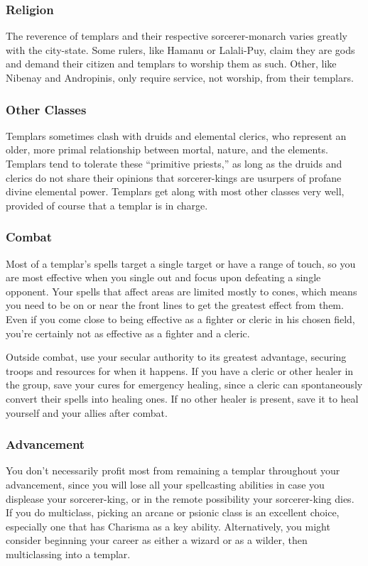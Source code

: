\subsubsection{Religion}
The reverence of templars and their respective sorcerer-monarch varies greatly with the city-state. Some rulers, like Hamanu or Lalali-Puy, claim they are gods and demand their citizen and templars to worship them as such. Other, like Nibenay and Andropinis, only require service, not worship, from their templars.

\subsubsection{Other Classes}
Templars sometimes clash with druids and elemental clerics, who represent an older, more primal relationship between mortal, nature, and the elements. Templars tend to tolerate these ``primitive priests,'' as long as the druids and clerics do not share their opinions that sorcerer-kings are usurpers of profane divine elemental power. Templars get along with most other classes very well, provided of course that a templar is in charge.

\subsubsection{Combat}
Most of a templar's spells target a single target or have a range of touch, so you are most effective when you single out and focus upon defeating a single opponent. Your spells that affect areas are limited mostly to cones,
which means you need to be on or near the front lines to get the greatest effect from them. Even if you come close to being effective as a fighter or cleric in his chosen field, you're certainly not as effective as a fighter and a cleric.

Outside combat, use your secular authority to its greatest advantage, securing troops and resources for when it happens. If you have a cleric or other healer in the group, save your cures for emergency healing, since a cleric can spontaneously convert their spells into healing ones. If no other healer is present, save it to heal yourself and your allies after combat.

\subsubsection{Advancement}
You don't necessarily profit most from remaining a templar throughout your advancement, since you will lose all your spellcasting abilities in case you displease your sorcerer-king, or in the remote possibility your sorcerer-king dies. If you do multiclass, picking an arcane or psionic class is an excellent choice, especially one that has Charisma as a key ability. Alternatively, you might consider beginning your career as either a wizard or as a wilder, then multiclassing into a templar.

